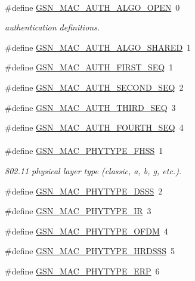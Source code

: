 \paragraph*{}
\begin{DoxyCompactItemize}
\item 
\#define \hyperlink{a00642_gacd47816d50e57aeb3b85dfdedc358f68}{GSN\_\-MAC\_\-AUTH\_\-ALGO\_\-OPEN}~0
\begin{DoxyCompactList}\small\item\em authentication definitions. \end{DoxyCompactList}\item 
\#define \hyperlink{a00642_gaed7a52fc252b37b7c3959abe9f1ae41d}{GSN\_\-MAC\_\-AUTH\_\-ALGO\_\-SHARED}~1
\item 
\#define \hyperlink{a00642_gaef1305dd2c4b1cf097722788e2c1ee57}{GSN\_\-MAC\_\-AUTH\_\-FIRST\_\-SEQ}~1
\item 
\#define \hyperlink{a00642_ga57052f7661d88b214bdd95c8813cf7ab}{GSN\_\-MAC\_\-AUTH\_\-SECOND\_\-SEQ}~2
\item 
\#define \hyperlink{a00642_ga9dacfef47d27c883bff514e485ef2e56}{GSN\_\-MAC\_\-AUTH\_\-THIRD\_\-SEQ}~3
\item 
\#define \hyperlink{a00642_ga6c6855fb6717e3e7dbf0015697bb75a2}{GSN\_\-MAC\_\-AUTH\_\-FOURTH\_\-SEQ}~4
\end{DoxyCompactItemize}

\paragraph*{}
\begin{DoxyCompactItemize}
\item 
\#define \hyperlink{a00642_ga53bbc17ad8f0c2d8481cd07a300a9640}{GSN\_\-MAC\_\-PHYTYPE\_\-FHSS}~1
\begin{DoxyCompactList}\small\item\em 802.11 physical layer type (classic, a, b, g, etc.). \end{DoxyCompactList}\item 
\#define \hyperlink{a00642_gaea4417ed84d382fcaec29ef522d491af}{GSN\_\-MAC\_\-PHYTYPE\_\-DSSS}~2
\item 
\#define \hyperlink{a00642_ga0c7253eeef7a0f2a018c4b1436bc584d}{GSN\_\-MAC\_\-PHYTYPE\_\-IR}~3
\item 
\#define \hyperlink{a00642_ga23cddc9f0e4001a0b73f391e92df0302}{GSN\_\-MAC\_\-PHYTYPE\_\-OFDM}~4
\item 
\#define \hyperlink{a00642_ga86c7ded9f98a88e0d0b6e1f8c3c710a9}{GSN\_\-MAC\_\-PHYTYPE\_\-HRDSSS}~5
\item 
\#define \hyperlink{a00642_ga1bef034ba2995a95023a571a00b85b9a}{GSN\_\-MAC\_\-PHYTYPE\_\-ERP}~6
\end{DoxyCompactItemize}

